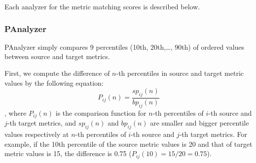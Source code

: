 




Each analyzer for the metric matching scores is described below.

\subsubsection{PAnalyzer}
PAnalyzer simply compares 9 percentiles (10th, 20th,\ldots, 90th) of ordered
values between source and target metrics.

First, we compute the difference of $n$-th
percentiles in source and target metric values by the following
equation:
\begin{equation}
P_{ij}(n)=\frac{sp_{ij}(n)}{bp_{ij}(n)}
\end{equation}
, where $P_{ij}(n)$ is the comparison function for $n$-th percentiles
of $i$-th source and $j$-th target metrics, and $sp_{ij}(n)$ and $bp_{ij}(n)$
are smaller and bigger percentile values respectively at $n$-th percentiles
of $i$-th source and $j$-th target metrics. For example, if the 10th
percentile of the source metric values is 20 and that of target metric values is
15, the difference is 0.75 ($P_{ij}(10)=15/20=0.75$).

